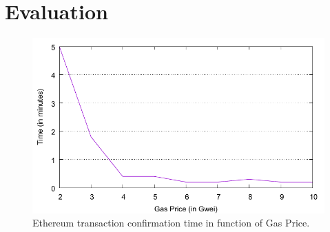 
\section{Evaluation}


\begin{figure}[t]
  \centering 
  \includegraphics[width=\columnwidth]{final-figures/ethereum-confirmation-time.pdf}
  \vspace{-10pt}
  \caption{Ethereum transaction confirmation time in function of Gas Price.}
  \label{fig:confirmationtime}
\end{figure}

